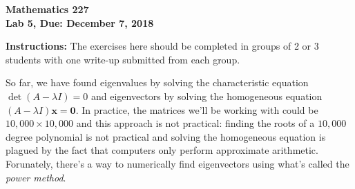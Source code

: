 \documentclass[12pt]{article}
\newcommand{\xvec}{{\mathbf x}}
\newcommand{\zerovec}{{\mathbf 0}}
\begin{document}
\noindent
{\bf Mathematics 227} \\ 
{\bf Lab 5, Due: December 7, 2018}

\bigskip
\noindent
{\bf Instructions:} The exercises here should be completed in groups
of 2 or 3 students with one write-up submitted from each group.

\medskip
So far, we have found eigenvalues by solving the characteristic
equation $\det(A-\lambda I) = 0$ and eigenvectors by solving the
homogeneous equation $(A-\lambda I)\xvec = \zerovec$.  In practice,
the matrices we'll be working with could be $10,000\times 10,000$ and
this approach is not practical:  finding the roots of
a $10,000$ degree polynomial is not practical and solving the homogeneous
equation is plagued by the fact that computers only perform
approximate arithmetic.  Forunately, there's a way to numerically find
eigenvectors using what's called the {\em power method}.
\end{document}
